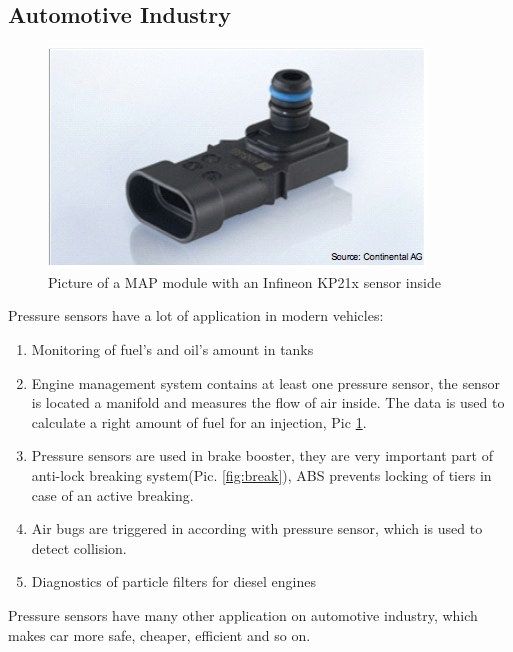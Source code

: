 \documentclass[english]{article}
\begin{document}
\subsection{Automotive Industry}

\begin{figure}
\centerline{\includegraphics[scale=0.5]{PressureSensors/ems}}
\caption{Picture of a MAP module with an Infineon KP21x sensor inside\label{fig:ems} \cite{inf}}
\end{figure}

Pressure sensors have a lot of application in modern vehicles:

\begin{enumerate}
\item Monitoring of fuel's and oil's amount in tanks
\item Engine management system contains at least one pressure sensor, the sensor is located a manifold and measures the flow of air inside. The data is used to calculate a right amount of fuel for an injection, Pic \ref{fig:ems}.
\item Pressure sensors are used in brake booster, they are very important part of anti-lock breaking system(Pic. \ref{fig:break}), ABS prevents locking of tiers in case of an active breaking.
\item Air bugs are triggered in according with pressure sensor, which is used to detect collision.
\item Diagnostics of particle filters for diesel engines
\end{enumerate}  

Pressure sensors have many other application on automotive industry, which makes car more safe, cheaper, efficient and so on.\cite{inf}
\end{document}
